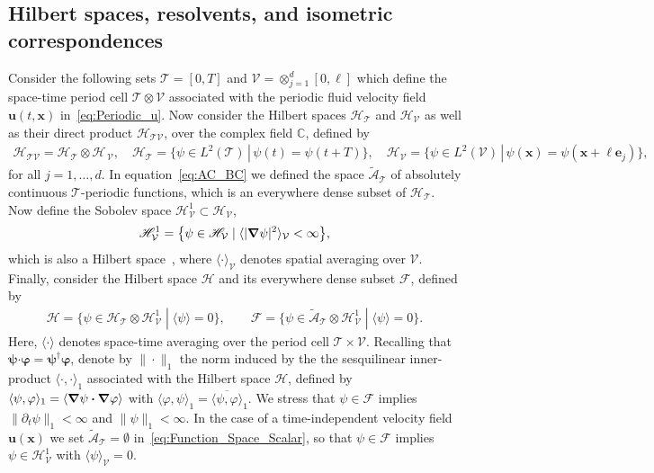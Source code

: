 \documentclass[leqno,onefignum,onetabnum]{siamltex1213}
\newcommand{\Tc}{\mathcal{T}}
\newcommand{\Vc}{\mathcal{V}}
\newcommand{\Hs}{\mathscr{H}}
\newcommand{\As}{\mathscr{A}}
\newcommand{\Fs}{\mathscr{F}}
\newcommand\bnabla{\mbox{\boldmath${\nabla}$}}
\providecommand\bcdot{\boldsymbol{\cdot}}
\newcommand{\vecx}{\boldsymbol{x}}
\newcommand{\vecu}{\boldsymbol{u}}
\newcommand{\vece}{\boldsymbol{e}}
\newcommand{\vecpsi}{\boldsymbol{\psi}}
\newcommand{\vecvarphi}{\boldsymbol{\varphi}}
\begin{document}
\subsection{Hilbert spaces, resolvents, and isometric
  correspondences} \label{sec:Hilbert_Isometric_Corr} 
%
Consider the following sets $\Tc=[0,T]$ and $\Vc=\otimes_{j=1}^d[0,\ell]$ which
define the space-time period cell $\Tc\otimes\Vc$ associated with the
periodic fluid velocity field $\vecu(t,\vecx)$
in~\eqref{eq:Periodic_u}. Now consider the Hilbert spaces $\Hs_{\Tc}$
and $\Hs_{\Vc}$ as well as their direct product
$\Hs_{\Tc\Vc}$, over the complex field $\mathbb{C}$, defined by
%
\begin{align}\label{eq:Hilbert_Spaces_scalar}
  \Hs_{\Tc\Vc}=\Hs_{\Tc}\otimes\Hs_{\,\Vc}, \quad
  \Hs_{\Tc}=\big\{\psi\in L^2(\Tc) \, | \, \psi(t)=\psi(t+T)\big\}, \quad
  \Hs_{\Vc}=\big\{\psi\in L^2(\Vc) \, | \, \psi(\vecx)=\psi(\vecx+\ell\vece_j)\big\},  
\end{align}
%
for all $j=1,\ldots,d$. In equation~\eqref{eq:AC_BC} we defined the space
$\tilde{\As}_{\Tc}$ of absolutely continuous $\Tc$-periodic functions,
which is an everywhere dense subset of $\Hs_{\Tc}$. Now define the
Sobolev space $\Hs^1_{\Vc}\subset\Hs_{\Vc}$,         
% 
\begin{align}\label{eq:Sobolev}
  \Hs^1_{\Vc}=\big\{\psi\in \Hs_{\Vc} \; | \; \langle|\bnabla \psi|^2\rangle_{\Vc}<\infty\big\}, 
\end{align}
%
which is also a Hilbert space~\cite{Folland:95}, where $\langle\cdot\rangle_{\Vc}$ 
denotes spatial averaging over $\Vc$.  Finally, consider the Hilbert
space $\Hs$ and its everywhere dense subset $\Fs$, defined by
%
\begin{align}\label{eq:Function_Space_Scalar}
  \Hs=\big\{\psi\in\Hs_{\Tc}\otimes\Hs^1_{\Vc} \; | \; \langle \psi\rangle=0\big\}, \qquad
  \Fs=\big\{\psi\in\tilde{\As}_{\Tc}\otimes\Hs^1_{\Vc} \; | \; \langle \psi\rangle=0\big\}.
\end{align}
%
Here, $\langle\cdot\rangle$ denotes space-time averaging over the period cell
$\Tc\times\Vc$. Recalling that $\vecpsi\bcdot\vecvarphi=\vecpsi^\dagger\vecvarphi$,
denote by $\|\cdot\|_1$ the norm induced by the the sesquilinear  
inner-product $\langle\cdot,\cdot\rangle_1$ associated with the Hilbert space $\Hs$, defined by
$\langle\psi,\varphi\rangle_1=\left\langle\bnabla \psi\bcdot\bnabla \varphi \right\rangle$ with
$\langle\varphi,\psi\rangle_1=\overline{\langle\psi,\varphi\rangle}_1$.  
We stress that $\psi\in\Fs$ implies $\|\partial_t\psi\|_1<\infty$ and $\|\psi\|_1<\infty$. In the 
case of a time-independent velocity field $\vecu(\vecx)$ we set
$\tilde{\As}_{\Tc}=\emptyset$ in~\eqref{eq:Function_Space_Scalar}, so that
$\psi\in\Fs$ implies $\psi\in\Hs^1_{\Vc}$ with $\langle\psi\rangle_{\Vc}=0$.
\end{document}
